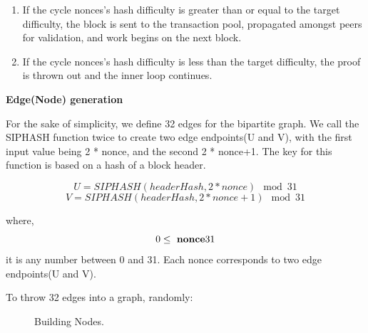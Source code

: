 \documentclass[a4paper,11pt]{article}
\begin{document}
\begin{enumerate}
\begin{enumerate}
\begin{enumerate}
			\item If the cycle nonces’s hash difficulty is greater than or equal to the target difficulty, the block is sent to the transaction pool, propagated amongst peers for validation, and work begins on the next block.
			\item If the cycle nonces’s hash difficulty is less than the target difficulty, the proof is thrown out and the inner loop continues.
		\end{enumerate}
		
\end{enumerate}

\end{enumerate}


\textbf{Edge(Node) generation}

For the sake of simplicity, we define 32 edges for the bipartite graph. We call the SIPHASH function twice to create two edge endpoints(U and V), with the first input value being 2 * nonce, and the second 2 * nonce+1. The key for this function is based on a hash of a block header.

\begin{equation}
{U = SIPHASH(headerHash, 2*nonce) \mod 31}
\end{equation}
\begin{equation}
{V = SIPHASH(headerHash, 2*nonce+1) \mod 31}
\end{equation}

where,
\begin{equation}
0\leq\ {\bf nonce}  31
\end{equation}it is any number between 0 and 31. Each nonce corresponds to two edge endpoints(U and V).

To throw 32 edges into a graph, randomly:

\begin{figure}[h]
	\centerline{%
	}
	\caption{Building Nodes.}
\end{figure}
\end{document}
